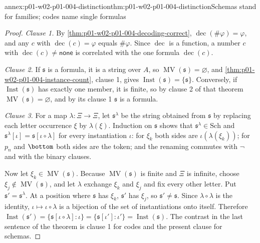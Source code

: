 \begin{annexitem}{annex:p01-w02-p01-004-distinction}{thm:p01-w02-p01-004-distinction}{Schemas stand for families; codes name single formulas}
\begin{proof}
\emph{Clause 1.} By \cref{thm:p01-w02-p01-004-decoding-correct},
\(\operatorname{dec}(\#\varphi)=\varphi\), and any \(c\) with
\(\operatorname{dec}(c)=\varphi\) equals \(\#\varphi\). Since
\(\operatorname{dec}\) is a function, a number \(c\) with
\(\operatorname{dec}(c)\ne\mathsf{none}\) is correlated with the one formula
\(\operatorname{dec}(c)\).

\emph{Clause 2.} If \(\mathfrak s\) is a formula, it is a string over \(A\),
so \(\operatorname{MV}(\mathfrak s)=\varnothing\), and
\cref{thm:p01-w02-p01-004-instance-count}, clause 1, gives
\(\operatorname{Inst}(\mathfrak s)=\{\mathfrak s\}\). Conversely, if
\(\operatorname{Inst}(\mathfrak s)\) has exactly one member, it is finite, so
by clause 2 of that theorem \(\operatorname{MV}(\mathfrak s)=\varnothing\),
and by its clause 1 \(\mathfrak s\) is a formula.

\emph{Clause 3.} For a map \(\lambda:\Xi\to\Xi\), let \(\mathfrak s^{\lambda}\)
be the string obtained from \(\mathfrak s\) by replacing each letter
occurrence \(\xi\) by \(\lambda(\xi)\). Induction on \(\mathfrak s\) shows that
\(\mathfrak s^{\lambda}\in\mathrm{Sch}\) and
\(\mathfrak s^{\lambda}[\iota]=\mathfrak s[\iota\circ\lambda]\) for every
instantiation \(\iota\): for \(\xi_k\) both sides are
\(\iota(\lambda(\xi_k))\); for \(p_n\) and \(\bottom\) both sides are the
token; and the renaming commutes with \(\neg\) and with the binary clauses.

Now let \(\xi_k\in\operatorname{MV}(\mathfrak s)\). Because
\(\operatorname{MV}(\mathfrak s)\) is finite and \(\Xi\) is infinite, choose
\(\xi_j\notin\operatorname{MV}(\mathfrak s)\), and let \(\lambda\) exchange
\(\xi_k\) and \(\xi_j\) and fix every other letter. Put
\(\mathfrak s'=\mathfrak s^{\lambda}\). At a position where \(\mathfrak s\) has
\(\xi_k\), \(\mathfrak s'\) has \(\xi_j\), so \(\mathfrak s'\ne\mathfrak s\).
Since \(\lambda\circ\lambda\) is the identity, \(\iota\mapsto\iota\circ\lambda\)
is a bijection of the set of instantiations onto itself. Therefore
\(\operatorname{Inst}(\mathfrak s')=\{\mathfrak s[\iota\circ\lambda]:\iota\}
=\{\mathfrak s[\iota']:\iota'\}=\operatorname{Inst}(\mathfrak s)\). The
contrast in the last sentence of the theorem is clause 1 for codes and the
present clause for schemas.
\end{proof}
\end{annexitem}

